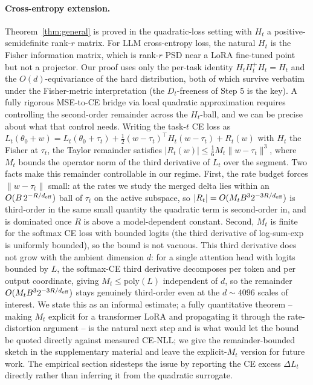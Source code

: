 
\paragraph{Cross-entropy extension.} Theorem~\ref{thm:general}
is proved in the quadratic-loss setting with $H_t$ a
positive-semidefinite rank-$r$ matrix. For LLM cross-entropy
loss, the natural $H_t$ is the Fisher information matrix, which
is rank-$r$ PSD near a LoRA fine-tuned point but not a projector.
Our proof uses only the per-task identity $H_tH_t^+H_t = H_t$
and the $O(d)$-equivariance of the hard distribution, both of
which survive verbatim under the Fisher-metric interpretation
(the $D_t$-freeness of Step 5 is the key). A fully rigorous
MSE-to-CE bridge via local quadratic approximation requires
controlling the second-order remainder across the $H_t$-ball, and
we can be precise about what that control needs. Writing the
task-$t$ CE loss as $L_t(\theta_0 + w) = L_t(\theta_0 + \tau_t) +
\tfrac12 (w-\tau_t)^\top H_t (w-\tau_t) + R_t(w)$ with $H_t$ the
Fisher at $\tau_t$, the Taylor remainder satisfies
$|R_t(w)| \leq \tfrac16 M_t \|w-\tau_t\|^3$, where $M_t$ bounds the
operator norm of the third derivative of $L_t$ over the segment.
Two facts make this remainder controllable in our regime. First,
the rate budget forces $\|w - \tau_t\|$ small: at the rates we
study the merged delta lies within an $O(B\,2^{-R/d_{\mathrm{eff}}})$ ball of
$\tau_t$ on the active subspace, so $|R_t| = O(M_t B^3
2^{-3R/d_{\mathrm{eff}}})$ is third-order in the same small quantity the
quadratic term is second-order in, and is dominated once $R$ is
above a model-dependent constant. Second, $M_t$ is finite for the
softmax CE loss with bounded logits (the third derivative of
log-sum-exp is uniformly bounded), so the bound is not vacuous.
This third derivative does not grow with the ambient dimension
$d$: for a single attention head with logits bounded by $L$, the
softmax-CE third derivative decomposes per token and per output
coordinate, giving $M_t \leq \mathrm{poly}(L)$ independent of $d$,
so the remainder $O(M_t B^3 2^{-3R/d_{\mathrm{eff}}})$ stays genuinely
third-order even at the $d \sim 4096$ scales of interest. We state
this as an informal estimate; a fully quantitative theorem -- making $M_t$ explicit for a
transformer LoRA and propagating it through the rate-distortion
argument -- is the natural next step and is what would let the
bound be quoted directly against measured CE-NLL; we give the
remainder-bounded sketch in the supplementary material and leave
the explicit-$M_t$ version for future work. The empirical section
sidesteps the issue by reporting the CE excess
$\Delta L_t$ directly rather than inferring it from the quadratic
surrogate.

